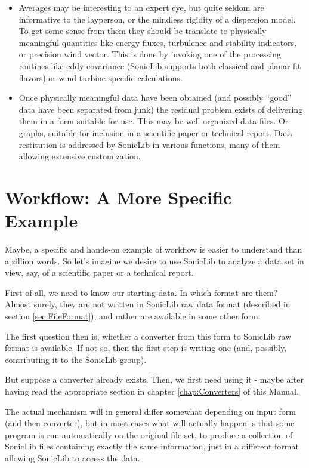 \documentclass[a4paper,10pt]{book}
\begin{document}
\begin{itemize}
 \item Averages may be interesting to an expert eye, but quite seldom are informative to the layperson, or the mindless rigidity of a dispersion model. To get some sense from them they should be translate to physically meaningful quantities like energy fluxes, turbulence and stability indicators, or precision wind vector. This is done by invoking one of the processing routines like eddy covariance (SonicLib supports both classical and planar fit flavors) or wind turbine specific calculations.
 \item Once physically meaningful data have been obtained (and possibly ``good'' data have been separated from junk) the residual problem exists of delivering them in a form suitable for use. This may be well organized data files. Or graphs, suitable for inclusion in a scientific paper or technical report. Data restitution is addressed by SonicLib in various functions, many of them allowing extensive customization.
\end{itemize}

\section{Workflow: A More Specific Example}
\label{sec:More specific workflow}

Maybe, a specific and hands-on example of workflow is easier to understand than a zillion words. So let's imagine we desire to use SonicLib to analyze a data set in view, say, of a scientific paper or a technical report.

First of all, we need to know our starting data. In which format are them? Almost surely, they are not written in SonicLib raw data format (described in section \ref{sec:FileFormat}), and rather are available in some other form.

The first question then is, whether a converter from this form to SonicLib raw format is available. If not so, then the first step is writing one (and, possibly, contributing it to the SonicLib group).

But suppose a converter already exists. Then, we first need using it - maybe after having read the appropriate section in chapter \ref{chap:Converters} of this Manual.

The actual mechanism will in general differ somewhat depending on input form (and then converter), but in most cases what will actually happen is that some program is run automatically on the original file set, to produce a collection of SonicLib files containing exactly the same information, just in a different format allowing SonicLib to access the data.
\end{document}
